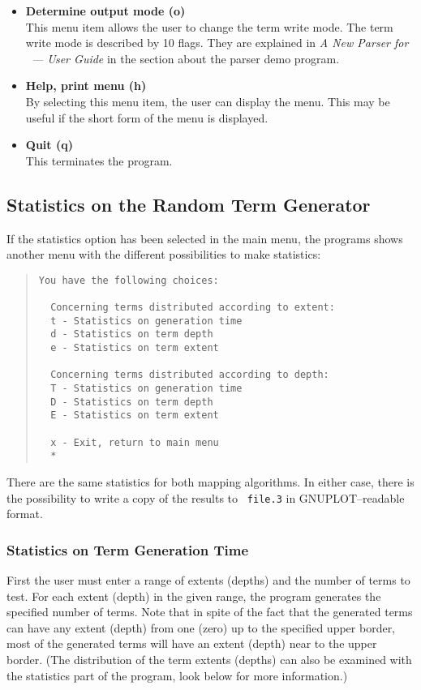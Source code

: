 \begin{itemize}
\item{\bf Determine output mode (o)}\\
   This menu item allows the user to change the term write mode. The
   term write mode is described by 10 flags. They are explained in {\em
   A New Parser for \redux\  --- User Guide} in the section about the
   parser demo program.

\item{\bf Help, print menu (h)}\\
   By selecting this menu item, the user can display the menu. This may
   be useful if the short form of the menu is displayed.

\item{\bf Quit (q)}\\
   This terminates the program.
\end{itemize}

\subsection{Statistics on the Random Term Generator}
\label{StatsOnRandomTermGenerator}
If the statistics option has been selected in the main menu, the
programs shows another menu with the different possibilities to make
statistics:
\begin{quote}
\begin{verbatim}
You have the following choices:
 
  Concerning terms distributed according to extent:
  t - Statistics on generation time
  d - Statistics on term depth
  e - Statistics on term extent
 
  Concerning terms distributed according to depth:
  T - Statistics on generation time
  D - Statistics on term depth
  E - Statistics on term extent
 
  x - Exit, return to main menu
  *
\end{verbatim}
\end{quote}
There are the same statistics for both mapping algorithms.  In either
case, there is the possibility to write a copy of the results to {\tt
file.3} in GNUPLOT--readable format.

\subsubsection{Statistics on Term Generation Time}
First the user must enter a range of extents (depths) and the number of
terms to test.  For each extent (depth) in the given range, the program
generates the specified number of terms.  Note that in spite of the
fact that the generated terms can have any extent (depth) from one
(zero) up to the specified upper border, most of the generated terms
will have an extent (depth) near to the upper border. (The distribution
of the term extents (depths) can also be examined with the statistics
part of the program, look below for more information.)

